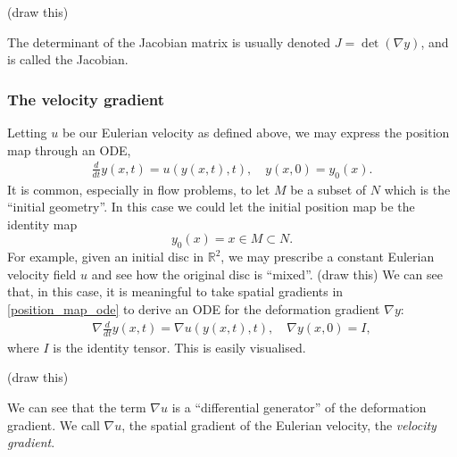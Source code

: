 \documentclass[11pt,a4paper]{memoir}
\begin{document}
\vskip 0.2in
(draw this)
\vskip 0.2in

The determinant of the Jacobian matrix is usually denoted $J = \det(\nabla y)$, and is called the Jacobian.

\subsubsection{The velocity gradient}
Letting $u$ be our Eulerian velocity as defined above, we may express the position map through an ODE,
\begin{equation}\label{position_map_ode}
\begin{split}
    \frac{d}{dt} y(x, t) = u(y(x, t), t),\quad
    y(x, 0) = y_0(x).
\end{split}
\end{equation}
It is common, especially in flow problems, to let $M$ be a subset of $N$ which is the ``initial geometry''.
In this case we could let the initial position map be the identity map
    $$y_0(x) = x \in M \subset N.$$
For example, given an initial disc in $\mathbb{R}^2$, we may prescribe a constant Eulerian velocity field $u$ and
see how the original disc is ``mixed''.
\vskip 0.2in
(draw this)
\vskip 0.2in
We can see that, in this case, it is meaningful to take spatial gradients in \eqref{position_map_ode} to derive an ODE for the deformation gradient $\nabla y$:
\begin{equation}\label{deformation_gradient_ode}
\begin{split}
    \nabla \frac{d}{dt} y(x, t) = \nabla u(y(x, t), t),\quad
    \nabla y(x, 0) = I,
\end{split}
\end{equation}
where $I$ is the identity tensor. This is easily visualised.

\vskip 0.2in
(draw this)
\vskip 0.2in

We can see that the term $\nabla u$ is a ``differential generator'' of the deformation gradient.
We call $\nabla u$, the spatial gradient of the Eulerian velocity, the \textit{velocity gradient}.

\end{document}
